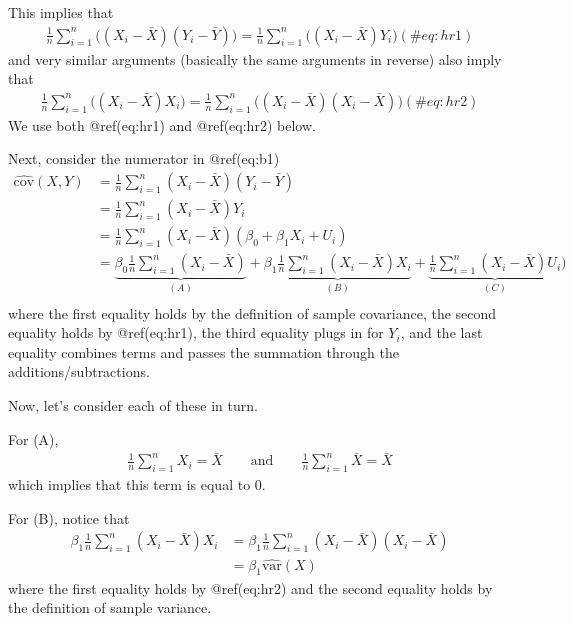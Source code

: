 \documentclass[
  letterpaper,
  DIV=11,
  numbers=noendperiod]{scrreprt}
\begin{document}
This implies that \begin{align}
  \frac{1}{n}\sum_{i=1}^n \Big( (X_i - \bar{X})(Y_i - \bar{Y})\Big) = \frac{1}{n}\sum_{i=1}^n \Big( (X_i - \bar{X})Y_i\Big) (\#eq:hr1)
\end{align} and very similar arguments (basically the same arguments in
reverse) also imply that \begin{align}
  \frac{1}{n}\sum_{i=1}^n \Big( (X_i - \bar{X})X_i\Big) = \frac{1}{n}\sum_{i=1}^n \Big( (X_i - \bar{X})(X_i - \bar{X})\Big) (\#eq:hr2)
\end{align} We use both @ref(eq:hr1) and @ref(eq:hr2) below.

\vspace{100pt}

Next, consider the numerator in @ref(eq:b1) \begin{align*}
  \widehat{\mathrm{cov}}(X,Y) &= \frac{1}{n} \sum_{i=1}^n (X_i - \bar{X})(Y_i - \bar{Y}) \\
  &= \frac{1}{n} \sum_{i=1}^n (X_i - \bar{X})Y_i \\
  &= \frac{1}{n} \sum_{i=1}^n (X_i - \bar{X})(\beta_0 + \beta_1 X_i + U_i) \\
  &= \underbrace{\beta_0 \frac{1}{n} \sum_{i=1}^n (X_i - \bar{X})}_{(A)} + \underbrace{\beta_1 \frac{1}{n} \sum_{i=1}^n (X_i - \bar{X}) X_i}_{(B)} + \underbrace{\frac{1}{n} \sum_{i=1}^n (X_i - \bar{X}) U_i}_{(C)}) \\
\end{align*} where the first equality holds by the definition of sample
covariance, the second equality holds by @ref(eq:hr1), the third
equality plugs in for \(Y_i\), and the last equality combines terms and
passes the summation through the additions/subtractions.

Now, let's consider each of these in turn.

For (A), \begin{align*}
  \frac{1}{n} \sum_{i=1}^n X_i = \bar{X} \qquad \textrm{and} \qquad \frac{1}{n} \sum_{i=1}^n \bar{X} = \bar{X}
\end{align*} which implies that this term is equal to 0.

For (B), notice that \begin{align*}
  \beta_1 \frac{1}{n} \sum_{i=1}^n (X_i - \bar{X}) X_i &= \beta_1 \frac{1}{n} \sum_{i=1}^n (X_i - \bar{X}) (X_i - \bar{X}) \\
  &= \beta_1 \widehat{\mathrm{var}}(X)
\end{align*} where the first equality holds by @ref(eq:hr2) and the
second equality holds by the definition of sample variance.
\end{document}
